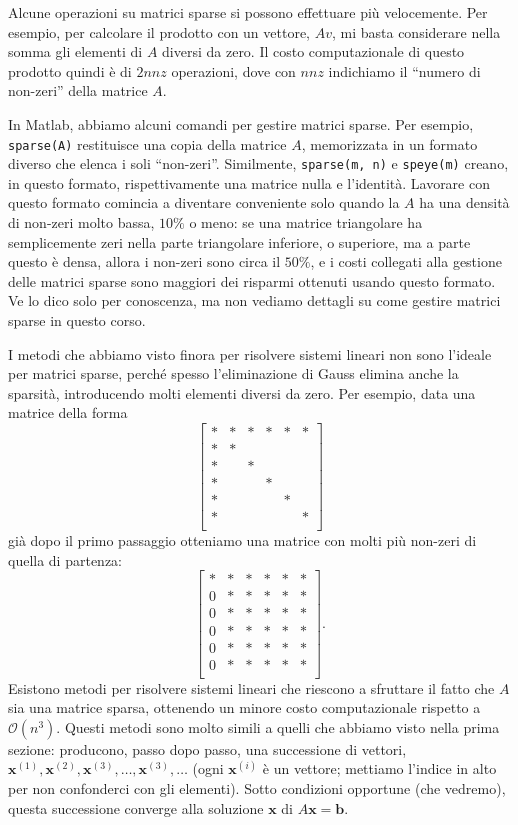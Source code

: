 \documentclass[a4paper]{report}
\theoremstyle{definiton}
\theoremstyle{remark}
\newcommand{\x}{\mathbf{x}}
\renewcommand{\b}{\mathbf{b}}
\begin{document}
Alcune operazioni su matrici sparse si possono effettuare più velocemente. Per esempio, per calcolare il prodotto con un vettore, $Av$, mi basta considerare nella somma gli elementi di $A$ diversi da zero. Il costo computazionale di questo prodotto quindi è di $2nnz$ operazioni, dove con $nnz$ indichiamo il ``numero di non-zeri'' della matrice $A$.

In Matlab, abbiamo alcuni comandi per gestire matrici sparse. Per esempio, \lstinline{sparse(A)} restituisce una copia della matrice $A$, memorizzata in un formato diverso che elenca i soli ``non-zeri''. Similmente, \lstinline{sparse(m, n)} e \lstinline{speye(m)} creano, in questo formato, rispettivamente una matrice nulla e l'identità. Lavorare con questo formato comincia a diventare conveniente solo quando la $A$ ha una densità di non-zeri molto bassa, $10\%$ o meno: se una matrice triangolare ha semplicemente zeri nella parte triangolare inferiore, o superiore, ma a parte questo è densa, allora i non-zeri sono circa il $50\%$, e i costi collegati alla gestione delle matrici sparse sono maggiori dei risparmi ottenuti usando questo formato. Ve lo dico solo per conoscenza, ma non vediamo dettagli su come gestire matrici sparse in questo corso.

I metodi che abbiamo visto finora per risolvere sistemi lineari non sono l'ideale per matrici sparse, perché spesso l'eliminazione di Gauss elimina anche la sparsità, introducendo molti elementi diversi da zero. Per esempio, data una matrice della forma
\[
\begin{bmatrix}
    * & * & * & * & * & *\\
    * & * \\
    * & & *\\
    * & & &*\\
    * & & & & *\\
    * & & & & & *\\
\end{bmatrix}
\]
già dopo il primo passaggio otteniamo una matrice con molti più non-zeri di quella di partenza:
\[
\begin{bmatrix}
    * & * & * & * & * & *\\
    0 & * & * & * & * & *\\
    0 & * & * & * & * & *\\
    0 & * & * & * & * & *\\
    0 & * & * & * & * & *\\
    0 & * & * & * & * & *\\
\end{bmatrix}.
\]
Esistono metodi per risolvere sistemi lineari che riescono a sfruttare il fatto che $A$ sia una matrice sparsa, ottenendo un minore costo computazionale rispetto a $\mathcal{O}(n^3)$. Questi metodi sono molto simili a quelli che abbiamo visto nella prima sezione: producono, passo dopo passo, una successione di vettori, $\x^{(1)}, \x^{(2)}, \x^{(3)},\dots,\x^{(3)}, \dots$ (ogni $\x^{(i)}$ è un vettore; mettiamo l'indice in alto per non confonderci con gli elementi). Sotto condizioni opportune (che vedremo), questa successione converge alla soluzione $\x$ di $A\x=\b$.
\end{document}

